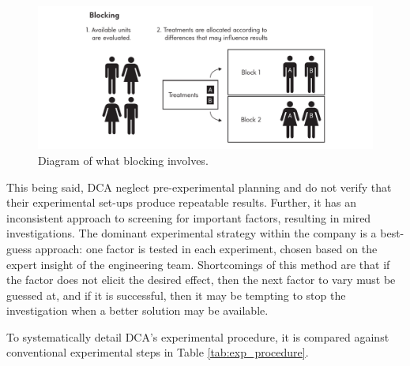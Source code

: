 \documentclass[11pt,a4paper,article]{memoir} %
\begin{document}
\begin{figure}
\includegraphics[width=\textwidth]{Blocking.pdf}
\caption{Diagram of what blocking involves.}
\label{fig:blocking}
\end{figure}
\par
This being said, DCA neglect pre-experimental planning and do not verify that their experimental set-ups produce repeatable results. Further, it has an inconsistent approach to screening for important factors, resulting in mired investigations. The dominant experimental strategy within the company is a best-guess approach: one factor is tested in each experiment, chosen based on the expert insight of the engineering team. Shortcomings of this method are that if the factor does not elicit the desired effect, then the next factor to vary must be guessed at, and if it is successful, then it may be tempting to stop the investigation when a better solution may be available.
\par
To systematically detail DCA's experimental procedure, it is compared against conventional experimental steps in Table \ref{tab:exp_procedure}.
\end{document}
